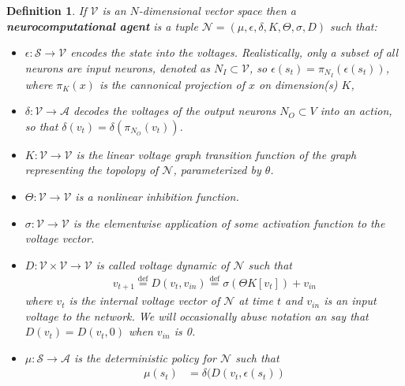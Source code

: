\documentclass{article} %
\newtheorem{definition}[theorem]{Definition}
\numberwithin{equation}{subsection}
\numberwithin{theorem}{subsection}
\def\defeq{\stackrel{\text{def}}{=}}
\theoremstyle{named}
\def\scriptv{{\mathcal V}}
\def\scripta{{\mathcal A}}
\def\scriptn{{\mathcal N}}
\def\scripts{{\mathcal S}}
\begin{document}
\begin{definition}

If $\scriptv$ is an $N$-dimensional vector space then a \textbf{neurocomputational agent} is a tuple $\scriptn = (\mu, \epsilon, \delta, K, \Theta, \sigma, D)$ such that:
\begin{itemize}
    \item $\epsilon : \scripts  \to \scriptv$ encodes the state into the voltages. Realistically, only a subset of all neurons are input neurons, denoted as $N_I \subset \scriptv$, so $\epsilon(s_t) = \pi_{N_I}(\epsilon(s_t))$, where  $\pi_K(x)$ is the cannonical projection of $x$ on dimension(s) $K$,
    \item $\delta: \scriptv \to \scripta$ decodes the voltages of the \emph{output neurons } $N_O \subset V$ into an action, so that $\delta(v_t) = \delta(\pi_{N_O}(v_t))$.
    \item $K: \scriptv \to \scriptv$ is the linear voltage graph transition function of the graph representing the topolopy of $\scriptn$, parameterized by $\theta$.
    \item $\Theta: \scriptv \to \scriptv$ is a nonlinear inhibition function.
    \item $\sigma: \scriptv \to \scriptv$ is the elementwise application of some activation function to the voltage vector.
    \item $D: \scriptv \times \scriptv \to \scriptv$ is called voltage dynamic of $\scriptn$ such that
    \begin{equation}
        \begin{aligned}
         v_{t+1} \defeq D(v_t,v_{in}) \defeq \sigma\left(\Theta K[v_t]\right) + v_{in}
        \end{aligned}
    \end{equation}
    where $v_t$ is the internal voltage vector of $\scriptn$ at time $t$ and $v_{in}$ is an input voltage to the network. We will occasionally abuse notation an say that $D(v_t) = D(v_t, 0)$ when $v_{in}$ is 0.
    \item $\mu: \scripts \to \scripta$ is the deterministic policy for $\scriptn$ such that
    \begin{equation}
    	\begin{aligned}
        \mu(s_t) &= \delta(D(v_t, \epsilon(s_t))
    	\end{aligned}
    \end{equation}
\end{itemize}


\end{definition}
\end{document}
